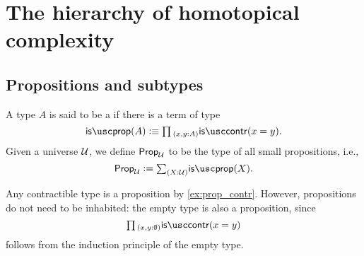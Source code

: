 
\section{The hierarchy of homotopical complexity}
\label{chap:hierarchy}



\subsection{Propositions and subtypes}

\begin{defn}
A type $A$ is said to be a  if there is a term of type
\begin{equation*}
\isprop(A)\defeq\prd{x,y:A}\iscontr(x=y).
\end{equation*}
Given a universe $\mathcal{U}$, we define $\mathsf{Prop}_{\mathcal{U}}$ to be the type of all small propositions, i.e.,
\begin{equation*}
  \prop_\UU\defeq\sm{X:\UU}\isprop(X).
\end{equation*}
\end{defn}

\begin{eg}\label{eg:prop_contr}
Any contractible type is a proposition by \cref{ex:prop_contr}. However, propositions do not need to be inhabited: the empty type is also a proposition, since
\begin{equation*}
\prd{x,y:\emptyt}\iscontr(x=y)
\end{equation*}
follows from the induction principle of the empty type.
\end{eg}

